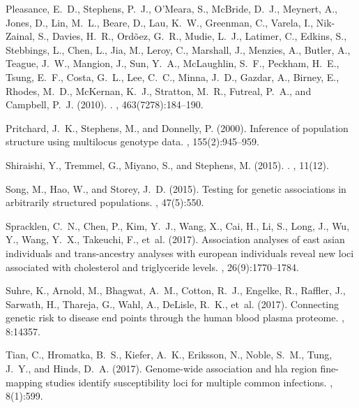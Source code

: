 \documentclass[9pt,article]{template}
\begin{document}
\begin{thebibliography}{}
Pleasance, E.~D., Stephens, P.~J., O'Meara, S., McBride, D.~J., Meynert, A.,
  Jones, D., Lin, M.~L., Beare, D., Lau, K.~W., Greenman, C., Varela, I.,
  Nik-Zainal, S., Davies, H.~R., Ord{\~{o}}ez, G.~R., Mudie, L.~J., Latimer,
  C., Edkins, S., Stebbings, L., Chen, L., Jia, M., Leroy, C., Marshall, J.,
  Menzies, A., Butler, A., Teague, J.~W., Mangion, J., Sun, Y.~A., McLaughlin,
  S.~F., Peckham, H.~E., Tsung, E.~F., Costa, G.~L., Lee, C.~C., Minna, J.~D.,
  Gazdar, A., Birney, E., Rhodes, M.~D., McKernan, K.~J., Stratton, M.~R.,
  Futreal, P.~A., and Campbell, P.~J. (2010).
.
, 463(7278):184--190.

Pritchard, J.~K., Stephens, M., and Donnelly, P. (2000).
\newblock Inference of population structure using multilocus genotype data.
, 155(2):945--959.

Shiraishi, Y., Tremmel, G., Miyano, S., and Stephens, M. (2015).
.
, 11(12).

Song, M., Hao, W., and Storey, J.~D. (2015).
\newblock Testing for genetic associations in arbitrarily structured
  populations.
, 47(5):550.

Spracklen, C.~N., Chen, P., Kim, Y.~J., Wang, X., Cai, H., Li, S., Long, J.,
  Wu, Y., Wang, Y.~X., Takeuchi, F., et~al. (2017).
\newblock Association analyses of east asian individuals and trans-ancestry
  analyses with european individuals reveal new loci associated with
  cholesterol and triglyceride levels.
, 26(9):1770--1784.

Suhre, K., Arnold, M., Bhagwat, A.~M., Cotton, R.~J., Engelke, R., Raffler, J.,
  Sarwath, H., Thareja, G., Wahl, A., DeLisle, R.~K., et~al. (2017).
\newblock Connecting genetic risk to disease end points through the human blood
  plasma proteome.
, 8:14357.

Tian, C., Hromatka, B.~S., Kiefer, A.~K., Eriksson, N., Noble, S.~M., Tung,
  J.~Y., and Hinds, D.~A. (2017).
\newblock Genome-wide association and hla region fine-mapping studies identify
  susceptibility loci for multiple common infections.
, 8(1):599.


\end{thebibliography}
\end{document}
